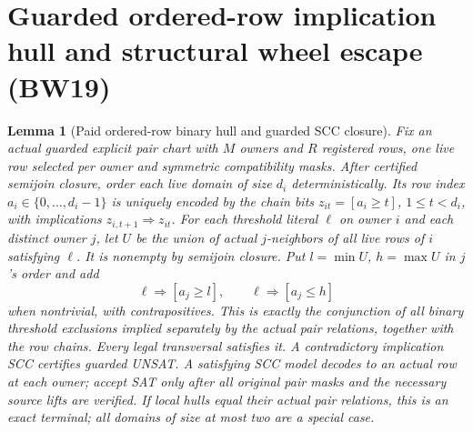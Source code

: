 \documentclass[11pt]{article}
\newtheorem{lemma}[theorem]{Lemma}
\begin{document}
\section{Guarded ordered-row implication hull and structural wheel escape (BW19)}\label{sec:bw19}
\begin{lemma}[Paid ordered-row binary hull and guarded SCC closure]\label{lem:bw19-hull}
Fix an actual guarded explicit pair chart with $M$ owners and $R$ registered rows, one live row selected per owner and symmetric compatibility masks. After certified semijoin closure, order each live domain of size $d_i$ deterministically. Its row index $a_i\in\{0,\ldots,d_i-1\}$ is uniquely encoded by the chain bits $z_{it}=[a_i\ge t]$, $1\le t<d_i$, with implications $z_{i,t+1}\Rightarrow z_{it}$. For each threshold literal $\ell$ on owner $i$ and each distinct owner $j$, let $U$ be the union of actual $j$-neighbors of all live rows of $i$ satisfying $\ell$. It is nonempty by semijoin closure. Put $l=\min U$, $h=\max U$ in $j$'s order and add
\[
\ell\Rightarrow [a_j\ge l],\qquad \ell\Rightarrow [a_j\le h]
\]
when nontrivial, with contrapositives. This is exactly the conjunction of all binary threshold exclusions implied separately by the actual pair relations, together with the row chains. Every legal transversal satisfies it. A contradictory implication SCC certifies guarded UNSAT. A satisfying SCC model decodes to an actual row at each owner; accept SAT only after all original pair masks and the necessary source lifts are verified. If local hulls equal their actual pair relations, this is an exact terminal; all domains of size at most two are a special case.
\end{lemma}
\end{document}

